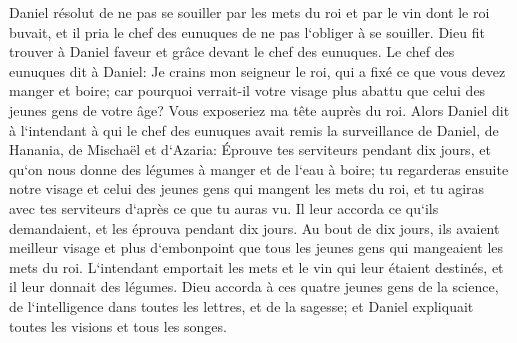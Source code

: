 \verse Daniel résolut de ne pas se souiller par les mets du roi et par le vin dont le roi buvait, et il pria le chef des eunuques de ne pas l`obliger à se souiller. 
\verse Dieu fit trouver à Daniel faveur et grâce devant le chef des eunuques. 
\verse Le chef des eunuques dit à Daniel: Je crains mon seigneur le roi, qui a fixé ce que vous devez manger et boire; car pourquoi verrait-il votre visage plus abattu que celui des jeunes gens de votre âge? Vous exposeriez ma tête auprès du roi. 
\verse Alors Daniel dit à l`intendant à qui le chef des eunuques avait remis la surveillance de Daniel, de Hanania, de Mischaël et d`Azaria: 
\verse Éprouve tes serviteurs pendant dix jours, et qu`on nous donne des légumes à manger et de l`eau à boire; 
\verse tu regarderas ensuite notre visage et celui des jeunes gens qui mangent les mets du roi, et tu agiras avec tes serviteurs d`après ce que tu auras vu. 
\verse Il leur accorda ce qu`ils demandaient, et les éprouva pendant dix jours. 
\verse Au bout de dix jours, ils avaient meilleur visage et plus d`embonpoint que tous les jeunes gens qui mangeaient les mets du roi. 
\verse L`intendant emportait les mets et le vin qui leur étaient destinés, et il leur donnait des légumes. 
\verse Dieu accorda à ces quatre jeunes gens de la science, de l`intelligence dans toutes les lettres, et de la sagesse; et Daniel expliquait toutes les visions et tous les songes. 
